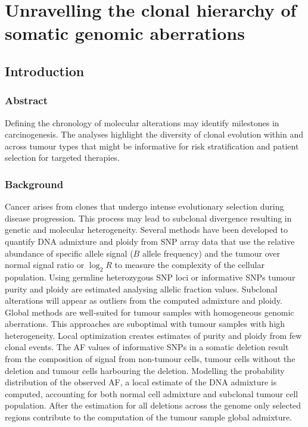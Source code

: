 \graphicspath{{chapters/papers/04/images}}
\chapter{Unravelling the clonal hierarchy of somatic genomic aberrations}

\section{Introduction}

	\subsection{Abstract}
	Defining the chronology of molecular alterations may identify milestones in carcinogenesis.
	The analyses highlight the diversity of clonal evolution within and across tumour types that might be informative for risk stratification and patient selection for targeted therapies.

	\subsection{Background}
	Cancer arises from clones that undergo intense evolutionary selection during disease progression.
	This process may lead to subclonal divergence resulting in genetic and molecular heterogeneity.
	Several methods have been developed to quantify DNA admixture and ploidy from SNP array data that use the relative abundance of specific allele signal ($B$ allele frequency) and the tumour over normal signal ratio or $\log_2 R$ to measure the complexity of the cellular population.
	Using germline heterozygous SNP loci or informative SNPs tumour purity and ploidy are estimated analysing allelic fraction values.
	Subclonal alterations will appear as outliers from the computed admixture and ploidy.
	Global methods are well-suited for tumour samples with homogeneous genomic aberrations.
	This approaches are suboptimal with tumour samples with high heterogeneity.
	Local optimization creates estimates of purity and ploidy from few clonal events.
	The AF values of informative SNPs in a somatic deletion result from the composition of signal from non-tumour cells, tumour cells without the deletion and tumour cells harbouring the deletion.
	Modelling the probability distribution of the observed AF, a local estimate of the DNA admixture is computed, accounting for both normal cell admixture and subclonal tumour cell population.
	After the estimation for all deletions across the genome only selected regions contribute to the computation of the tumour sample global admixture.

